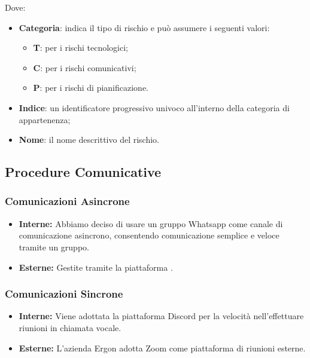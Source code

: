 Dove:
\begin{itemize}
    \item \textbf{Categoria}: indica il tipo di rischio e può assumere i seguenti valori:
    \begin{itemize}
        \item \textbf{T}: per i rischi tecnologici;
        \item \textbf{C}: per i rischi comunicativi;
        \item \textbf{P}: per i rischi di pianificazione.
    \end{itemize}
    \item \textbf{Indice}: un identificatore progressivo univoco all'interno della categoria di appartenenza;
    \item \textbf{Nome}: il nome descrittivo del rischio.
\end{itemize}

\subsection{Procedure Comunicative}

\subsubsection{Comunicazioni Asincrone}
\begin{itemize}
    \item \textbf{Interne:} Abbiamo deciso di usare un gruppo Whatsapp come canale di comunicazione asincrono, consentendo comunicazione semplice e veloce tramite un gruppo.
    \item \textbf{Esterne:} Gestite tramite la piattaforma .
\end{itemize}

\subsubsection{Comunicazioni Sincrone}
\begin{itemize}
    \item \textbf{Interne:} Viene adottata la piattaforma Discord per la velocità nell'effettuare riunioni in chiamata vocale.
    \item \textbf{Esterne:} L'azienda Ergon adotta Zoom come piattaforma di riunioni esterne.
\end{itemize}

